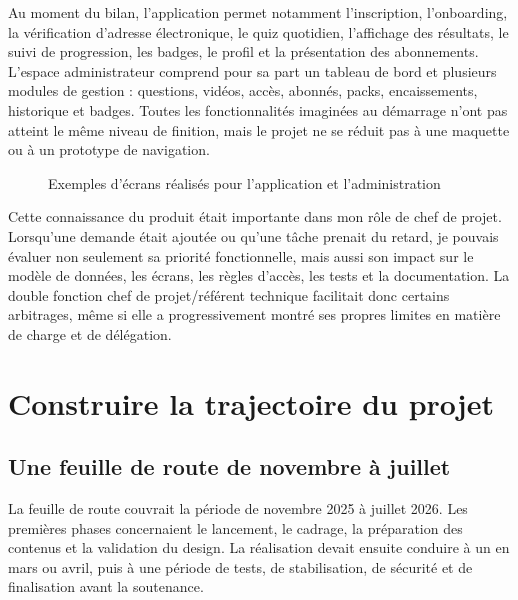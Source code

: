 Au moment du bilan, l'application permet notamment l'inscription, l'onboarding, la vérification d'adresse électronique, le quiz quotidien, l'affichage des résultats, le suivi de progression, les badges, le profil et la présentation des abonnements. L'espace administrateur comprend pour sa part un tableau de bord et plusieurs modules de gestion : questions, vidéos, accès, abonnés, packs, encaissements, historique et badges. Toutes les fonctionnalités imaginées au démarrage n'ont pas atteint le même niveau de finition, mais le projet ne se réduit pas à une maquette ou à un prototype de navigation.

\begin{figure}[H]
\centering
{}
\caption{Exemples d'écrans réalisés pour l'application et l'administration}
\label{fig:lynx-ecrans}
\end{figure}

Cette connaissance du produit était importante dans mon rôle de chef de projet. Lorsqu'une demande était ajoutée ou qu'une tâche prenait du retard, je pouvais évaluer non seulement sa priorité fonctionnelle, mais aussi son impact sur le modèle de données, les écrans, les règles d'accès, les tests et la documentation. La double fonction chef de projet/référent technique facilitait donc certains arbitrages, même si elle a progressivement montré ses propres limites en matière de charge et de délégation.

\section{Construire la trajectoire du projet}

\subsection{Une feuille de route de novembre à juillet}

La feuille de route couvrait la période de novembre 2025 à juillet 2026. Les premières phases concernaient le lancement, le cadrage, la préparation des contenus et la validation du design. La réalisation devait ensuite conduire à un  en mars ou avril, puis à une période de tests, de stabilisation, de sécurité et de finalisation avant la soutenance.

